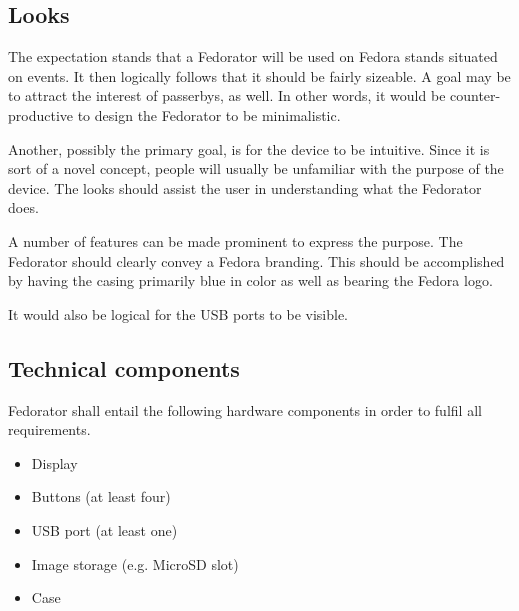         \subsection{Looks}
            
            The expectation stands that a Fedorator will be used on Fedora stands situated on events.  It then logically follows that it should be fairly sizeable.  A goal may be to attract the interest of passerbys, as well.  In other words, it would be counter-productive to design the Fedorator to be minimalistic.
            
            Another, possibly the primary goal, is for the device to be intuitive.  Since it is sort of a novel concept, people will usually be unfamiliar with the purpose of the device.  The looks should assist the user in understanding what the Fedorator does.
            
            A number of features can be made prominent to express the purpose.  The Fedorator should clearly convey a Fedora branding.  This should be accomplished by having the casing primarily blue in color as well as bearing the Fedora logo.
            
            
            It would also be logical for the USB ports to be visible.
            
            
            
        \subsection{Technical components}
            
            Fedorator shall entail the following hardware components in order to fulfil all requirements.
            \begin{itemize}
                \item Display
                \item Buttons (at least four)
                \item USB port (at least one)
                \item Image storage (e.g. MicroSD slot)
                \item Case
            \end{itemize}
            
